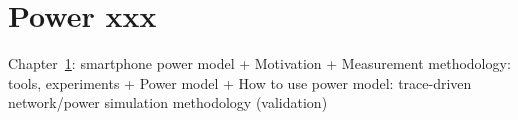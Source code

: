 \chapter{Power xxx} \label{chap:power}

Chapter~\ref{chap:power}: smartphone power model
	+ Motivation
	+ Measurement methodology: tools, experiments
	+ Power model
	+ How to use power model: trace-driven network/power simulation methodology (validation)


